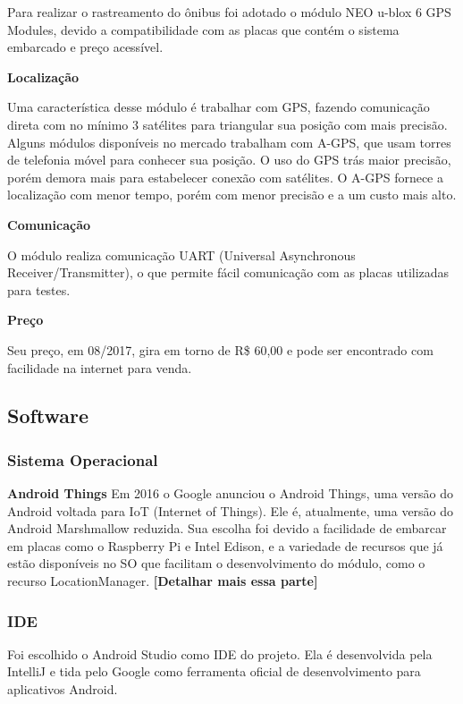 \documentclass[a4paper, 12pt]{article}
\begin{document}
Para realizar o rastreamento do ônibus foi adotado o módulo NEO u-blox 6 GPS Modules, devido a compatibilidade com as placas que contém o sistema embarcado e preço acessível. 

\textbf{Localização}

Uma característica desse módulo é trabalhar com GPS, fazendo comunicação direta com no mínimo 3 satélites para triangular sua posição com mais precisão. Alguns módulos disponíveis no mercado trabalham com A-GPS, que usam torres de telefonia móvel para conhecer sua posição.
O uso do GPS trás maior precisão, porém demora mais para estabelecer conexão com satélites. O A-GPS fornece a localização com menor tempo, porém com menor precisão e a um custo mais alto.

\textbf{Comunicação}

O módulo realiza comunicação UART (Universal Asynchronous Receiver/Transmitter), o que permite fácil comunicação com as placas utilizadas para testes.

\textbf{Preço}

Seu preço, em 08/2017, gira em torno de R\$ 60,00 e pode ser encontrado com facilidade na internet para venda. 


\subsection{Software}

\subsubsection{Sistema Operacional}

\textbf{Android Things}
Em 2016 o Google anunciou o Android Things, uma versão do Android voltada para IoT (Internet of Things). Ele é, atualmente, uma versão do Android Marshmallow reduzida. Sua escolha foi devido a facilidade de embarcar em placas como o Raspberry Pi e Intel Edison, e a variedade de recursos que já estão disponíveis no SO que facilitam o desenvolvimento do módulo, como o recurso LocationManager. \textbf{[Detalhar mais essa parte]}

\subsubsection{IDE}

Foi escolhido o Android Studio como IDE do projeto. Ela é desenvolvida pela IntelliJ e tida pelo Google como ferramenta oficial de desenvolvimento para aplicativos Android.
\end{document}
